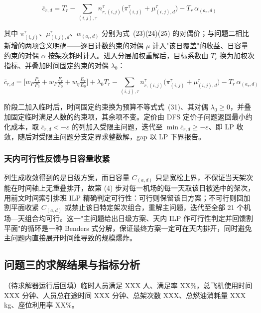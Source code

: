 \documentclass[zihao=-4,a4paper]{ctexart}
\begin{document}
\begin{equation}
  \bar c_{r,d}=T_r-\sum_{(i,j),\tau} n_{r,(i,j)}^{\tau}\big(\pi_{(i,j)}^{\tau}+\mu_{(i,j),d}^{\tau}\big)-T_r\,\alpha_{(a_r,d)}
\end{equation}

其中 $\pi_{(i,j)}^{\tau}$、$\mu_{(i,j),d}^{\tau}$、$\alpha_{(a_r,d)}$ 分别为式~(23)(24)(25) 的对偶价；与问题二相比新增的两项含义明确——逐日计数约束的对偶 $\mu$ 计入"该日覆盖"的收益、日容量约束的对偶 $\alpha$ 按架次耗时计入。进入分层加权重解后，目标系数由 $T_r$ 换为加权次指标、并叠加时间固定约束的对偶 $\lambda_0$：

\begin{equation}
  \bar c_{r,d}=\Big[w_P\tfrac{P_r}{P_0}+w_F\tfrac{F_r}{F_0}+w_\eta\tfrac{E_r}{E_0}\Big]+\lambda_0 T_r-\sum_{(i,j),\tau}n_{r,(i,j)}^{\tau}\big(\pi_{(i,j)}^{\tau}+\mu_{(i,j),d}^{\tau}\big)-T_r\,\alpha_{(a_r,d)}
\end{equation}

阶段二加入临时后，时间固定约束换为预算不等式式~(31)、其对偶 $\lambda_0\ge0$，并叠加固定临时满足人数的约束项，其余项不变。定价由 DFS 定价子问题返回最小约化成本，取 $\bar c_{r,d}<-\varepsilon$ 的列加入受限主问题，迭代至 $\min\bar c_{r,d}\ge-\varepsilon$、即 LP 收敛，随后对受限主问题分支定界求整数解，gap 以 LP 下界报告。

\subsubsection{天内可行性反馈与日容量收紧}

列生成收敛得到的是日级方案，而日容量 $C_{(a,d)}$ 只是宽松上界，不保证当天架次能在时间轴上无重叠排开，故第 (4) 步对每一机场的每一天取该日被选中的架次，用前文时间索引排班 ILP 精确判定可行性：可行则保留该日方案；不可行则回加割平面收紧 $C_{(a,d)}$ 或禁止该日特定架次组合，重解主问题，迭代至全部 21 个机场—天组合均可行。这一"主问题给出日级方案、天内 ILP 作可行性判定并回馈割平面"的循环是一种 Benders 式分解，保证最终方案一定可在天内排开，同时避免主问题内直接展开时间维导致的规模爆炸。

\subsection{问题三的求解结果与指标分析}

（待求解器运行后回填）临时人员满足 XXX 人、满足率 XX\%，总飞机使用时间 XXX 分钟、人员总在途时间 XXX 分钟、总架次数 XXX、总燃油消耗量 XXX kg、座位利用率 XX\%。

\end{document}
